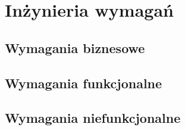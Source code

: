 \chapter{Inżynieria wymagań}
\label{cha:inzyneriaWymagan}

\section{Wymagania biznesowe}
\label{sec:wymaganiaBiznesowe}

\section{Wymagania funkcjonalne}
\label{sec:wymaganiaFunkcjonalne}

\section{Wymagania niefunkcjonalne}
\label{sec;wymaganiaNiefunkcjonalne}


